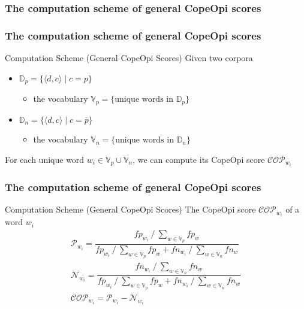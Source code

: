\documentclass[mathserif]{beamer}
\DeclareMathOperator*{\divby}{/}
\DeclareMathOperator*{\where}{|}
\begin{document}
\subsubsection{The computation scheme of general CopeOpi scores}
\begin{frame}
\frametitle{The computation scheme of general CopeOpi scores}
\begin{block}{Computation Scheme (General CopeOpi Scores)}
Given two corpora
\begin{itemize}
\item $\mathbb{D}_p=\{\langle d,c \rangle \where c=p\}$
	\begin{itemize}
	\item the vocabulary $\mathbb{V}_p=\{\text{unique words in }\mathbb{D}_p\}$
	\end{itemize}
\item $\mathbb{D}_n=\{\langle d,c \rangle \where c=\overline{p}\}$
	\begin{itemize}
	\item the vocabulary $\mathbb{V}_n=\{\text{unique words in }\mathbb{D}_n\}$
	\end{itemize}
\end{itemize}
For each unique word $w_i \in \mathbb{V}_p \cup \mathbb{V}_n$, we can compute its CopeOpi score $\mathcal{COP}_{w_i}$
\end{block}
\end{frame}
\begin{frame}
\frametitle{The computation scheme of general CopeOpi scores}
\begin{block}{Computation Scheme (General CopeOpi Scores)}
The CopeOpi score $\mathcal{COP}_{w_i}$ of a word $w_i$
\begin{equation*}
\begin{gathered}
\mathcal{P}_{w_i} = \dfrac {
	fp_{w_i} \divby \sum_{w \in \mathbb{V}_p} fp_w
}{
	fp_{w_i} \divby \sum_{w \in \mathbb{V}_p} fp_w +
	fn_{w_i} \divby \sum_{w \in \mathbb{V}_n} fn_w
}
\\
\mathcal{N}_{w_i} = \dfrac {
	fn_{w_i} \divby \sum_{w \in \mathbb{V}_n} fn_w
}{
	fp_{w_i} \divby \sum_{w \in \mathbb{V}_p} fp_w +
	fn_{w_i} \divby \sum_{w \in \mathbb{V}_n} fn_w
}
\\
\mathcal{COP}_{w_i} = \mathcal{P}_{w_i} - \mathcal{N}_{w_i}
\end{gathered}
\end{equation*}
\end{block}
\begin{flushright}
\vspace{-9.5ex}
\end{flushright}
\end{frame}
\end{document}
